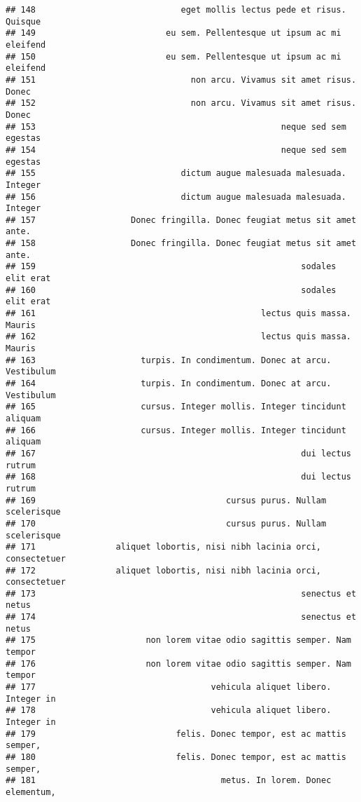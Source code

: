 \documentclass[
]{article}
\begin{document}
\begin{verbatim}
## 148                             eget mollis lectus pede et risus. Quisque
## 149                          eu sem. Pellentesque ut ipsum ac mi eleifend
## 150                          eu sem. Pellentesque ut ipsum ac mi eleifend
## 151                               non arcu. Vivamus sit amet risus. Donec
## 152                               non arcu. Vivamus sit amet risus. Donec
## 153                                                 neque sed sem egestas
## 154                                                 neque sed sem egestas
## 155                             dictum augue malesuada malesuada. Integer
## 156                             dictum augue malesuada malesuada. Integer
## 157                   Donec fringilla. Donec feugiat metus sit amet ante.
## 158                   Donec fringilla. Donec feugiat metus sit amet ante.
## 159                                                     sodales elit erat
## 160                                                     sodales elit erat
## 161                                             lectus quis massa. Mauris
## 162                                             lectus quis massa. Mauris
## 163                     turpis. In condimentum. Donec at arcu. Vestibulum
## 164                     turpis. In condimentum. Donec at arcu. Vestibulum
## 165                     cursus. Integer mollis. Integer tincidunt aliquam
## 166                     cursus. Integer mollis. Integer tincidunt aliquam
## 167                                                     dui lectus rutrum
## 168                                                     dui lectus rutrum
## 169                                      cursus purus. Nullam scelerisque
## 170                                      cursus purus. Nullam scelerisque
## 171                aliquet lobortis, nisi nibh lacinia orci, consectetuer
## 172                aliquet lobortis, nisi nibh lacinia orci, consectetuer
## 173                                                     senectus et netus
## 174                                                     senectus et netus
## 175                      non lorem vitae odio sagittis semper. Nam tempor
## 176                      non lorem vitae odio sagittis semper. Nam tempor
## 177                                   vehicula aliquet libero. Integer in
## 178                                   vehicula aliquet libero. Integer in
## 179                            felis. Donec tempor, est ac mattis semper,
## 180                            felis. Donec tempor, est ac mattis semper,
## 181                                     metus. In lorem. Donec elementum,

\end{verbatim}
\end{document}
